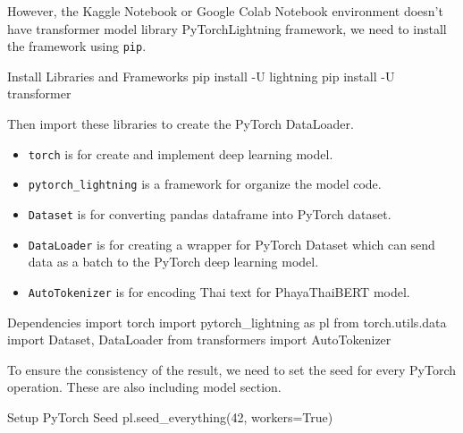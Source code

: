 \documentclass[12pt, a4paper]{article}
\begin{document}
                \vspace{0.5em}

                However, the Kaggle Notebook or Google Colab Notebook environment doesn't have transformer model library
                PyTorchLightning framework, we need to install the framework using \texttt{pip}.

                \begin{codeblock}[minted language=bat]{Install Libraries and Frameworks}
                    pip install -U lightning
                    pip install -U transformer
                \end{codeblock}

                \noindent Then import these libraries to create the PyTorch DataLoader.
                \begin{itemize}
                    \item \texttt{torch} is for create and implement deep learning model.
                    \item \texttt{pytorch\_lightning} is a framework for organize the model code.
                    \item \texttt{Dataset} is for converting pandas dataframe into PyTorch dataset.
                    \item \texttt{DataLoader} is for creating a wrapper for PyTorch Dataset which can
                    send data as a batch to the PyTorch deep learning model.
                    \item \texttt{AutoTokenizer} is for encoding Thai text for PhayaThaiBERT model.
                \end{itemize}

                \begin{codeblock}{Dependencies}
                    import torch
                    import pytorch_lightning as pl
                    from torch.utils.data import Dataset, DataLoader
                    from transformers import AutoTokenizer
                \end{codeblock}

                To ensure the consistency of the result, we need to set the seed for every PyTorch operation.
                These are also including model section.
                \begin{codeblock}{Setup PyTorch Seed}
                    pl.seed_everything(42, workers=True)
                \end{codeblock}

    \pagebreak
\end{document}
